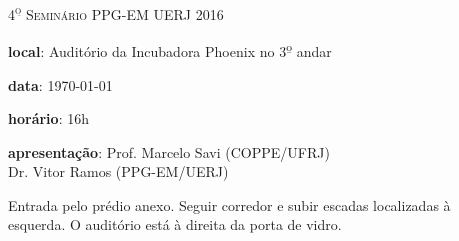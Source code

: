\typeout{ ====================================================================}
\typeout{ ====================================================================}



	



\LARGE

\begin{center}
\textsc{4\textsuperscript{\b o} Seminário PPG-EM UERJ 2016}\\[0.1cm]
\end{center}

\textbf{local}: Auditório da Incubadora Phoenix no 3\textsuperscript{\b
o} andar 

\textbf{data}: {\today}

\textbf{horário}: 16h

\textbf{apresentação}: Prof. Marcelo Savi (COPPE/UFRJ)  \\
 Dr. Vitor Ramos (PPG-EM/UERJ)

\centering

\vspace{2cm}
\begin{minipage}{15cm}
\begin{framed}
Entrada pelo prédio anexo. Seguir corredor e subir escadas localizadas à
esquerda. O auditório está à direita da porta de vidro. 
\end{framed}

\end{minipage}




